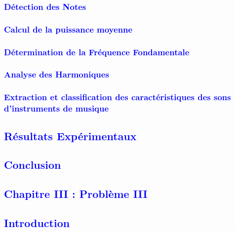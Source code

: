\documentclass{article}
\numberwithin{equation}{section}
\begin{document}
\newpage
\textcolor{blue}{\subsubsection{Détection des Notes}}

\textcolor{blue}{\subsubsection{Calcul de la puissance moyenne}}

\textcolor{blue}{\subsubsection{Détermination de la Fréquence Fondamentale}}

\textcolor{blue}{\subsubsection{Analyse des Harmoniques}}

\textcolor{blue}{\subsubsection{Extraction et classification des caractéristiques des sons d'instruments de musique}}

\textcolor{blue}{\subsection{Résultats Expérimentaux}}

\newpage
\textcolor{blue}{\subsection{Conclusion}}

\newpage
\textcolor{blue}{\section{Chapitre III : Problème III}}
\textcolor{blue}{\subsection{Introduction}}

\end{document}
